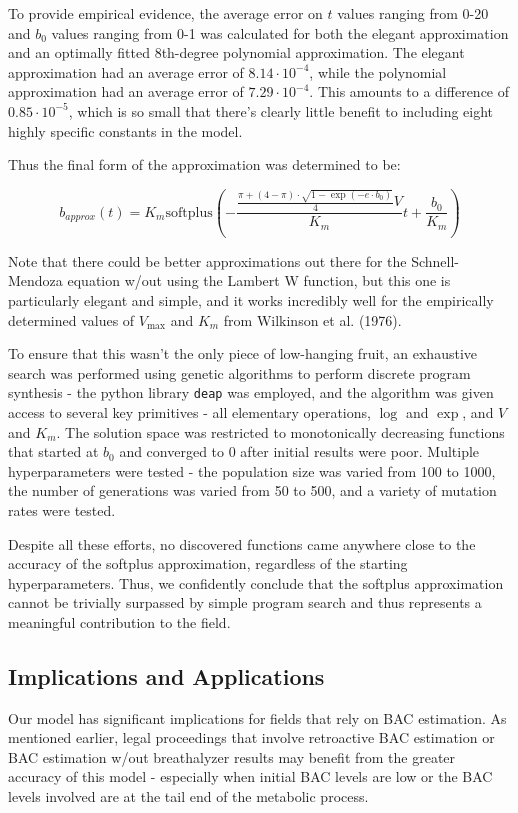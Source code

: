 \documentclass[12pt]{article}
\begin{document}
To provide empirical evidence, the average error on $t$ values ranging from 0-20 and $b_0$ values ranging from 0-1 was calculated for both the elegant approximation and an optimally fitted 8th-degree polynomial approximation. The elegant approximation had an average error of $8.14 \cdot 10^{-4}$, while the polynomial approximation had an average error of $7.29 \cdot 10^{-4}$. This amounts to a difference of $0.85 \cdot 10^{-5}$, which is so small that there's clearly little benefit to including eight highly specific constants in the model.



Thus the final form of the approximation was determined to be:

\[
    b_{approx}(t) = K_m\mathrm{softplus}(-\frac{\frac{\pi + (4 - \pi) \cdot \sqrt{1 - \exp(-e \cdot b_0)}}{4}V}{K_m}t + \frac{b_0}{K_m})
\]

Note that there could be better approximations out there for the Schnell-Mendoza equation w/out using the Lambert W function, but this one is particularly elegant and simple, and it works incredibly well for the empirically determined values of $V_{\text{max}}$ and $K_m$ from Wilkinson et al. (1976).

To ensure that this wasn't the only piece of low-hanging fruit, an exhaustive search was performed using genetic algorithms to perform discrete program synthesis - the python library \texttt{deap} was employed, and the algorithm was given access to several key primitives - all elementary operations, $\log$ and $\exp$, and $V$ and $K_m$. The solution space was restricted to monotonically decreasing functions that started at $b_0$ and converged to 0 after initial results were poor. Multiple hyperparameters were tested - the population size was varied from 100 to 1000, the number of generations was varied from 50 to 500, and a variety of mutation rates were tested. 

Despite all these efforts, no discovered functions came anywhere close to the accuracy of the softplus approximation, regardless of the starting hyperparameters. Thus, we confidently conclude that the softplus approximation cannot be trivially surpassed by simple program search and thus represents a meaningful contribution to the field.


\subsection{Implications and Applications}
Our model has significant implications for fields that rely on BAC estimation. As mentioned earlier, legal proceedings that involve retroactive BAC estimation or BAC estimation w/out breathalyzer results may benefit from the greater accuracy of this model - especially when initial BAC levels are low or the BAC levels involved are at the tail end of the metabolic process.
\end{document}
